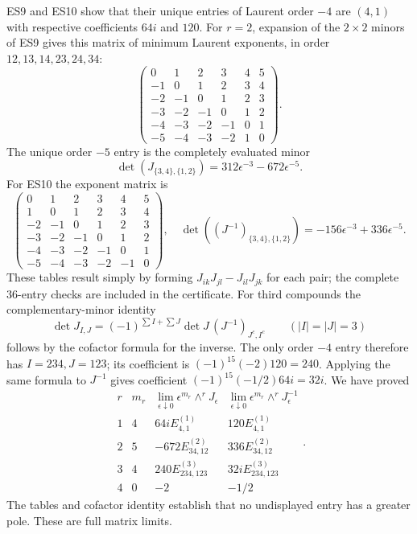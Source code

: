 \documentclass[11pt]{article}
\begin{document}
ES9 and ES10 show that their unique entries of Laurent order $-4$
are $(4,1)$ with respective coefficients $64i$ and $120$.
For $r=2$, expansion of the $2\times2$ minors of ES9 gives this
matrix of minimum Laurent exponents, in order $12,13,14,23,24,34$:
\[
 \begin{pmatrix}
 0&1&2&3&4&5\\-1&0&1&2&3&4\\-2&-1&0&1&2&3\\
 -3&-2&-1&0&1&2\\-4&-3&-2&-1&0&1\\-5&-4&-3&-2&1&0
 \end{pmatrix}.
 \tag{ES11}
\]
The unique order $-5$ entry is the completely evaluated minor
\[
 \det(J_{\{3,4\},\{1,2\}})=312\epsilon^{-3}-672\epsilon^{-5}.
\]
For ES10 the exponent matrix is
\[
 \begin{pmatrix}
 0&1&2&3&4&5\\1&0&1&2&3&4\\-2&-1&0&1&2&3\\
 -3&-2&-1&0&1&2\\-4&-3&-2&-1&0&1\\-5&-4&-3&-2&-1&0
 \end{pmatrix},
 \quad
 \det((J^{-1})_{\{3,4\},\{1,2\}})=-156\epsilon^{-3}+336\epsilon^{-5}.
 \tag{ES12}
\]
These tables result simply by forming $J_{ik}J_{jl}-J_{il}J_{jk}$
for each pair; the complete 36-entry checks are included in the
certificate. For third compounds the complementary-minor identity
\[
 \det J_{I,J}=(-1)^{\sum I+\sum J}\det J\,
                (J^{-1})_{J^c,I^c}\qquad(|I|=|J|=3)
\]
follows by the cofactor formula for the inverse. The only order
$-4$ entry therefore has $I=234,J=123$; its coefficient is
$(-1)^{15}(-2)120=240$. Applying the same formula to $J^{-1}$
gives coefficient $(-1)^{15}(-1/2)64i=32i$. We have proved
\[
\begin{array}{c|c|c|c}
 r&m_r&\lim_{\epsilon\downarrow0}\epsilon^{m_r}\wedge^rJ_\epsilon&
 \lim_{\epsilon\downarrow0}\epsilon^{m_r}\wedge^rJ_\epsilon^{-1}\\\hline
 1&4&64iE^{(1)}_{4,1}&120E^{(1)}_{4,1}\\
 2&5&-672E^{(2)}_{34,12}&336E^{(2)}_{34,12}\\
 3&4&240E^{(3)}_{234,123}&32iE^{(3)}_{234,123}\\
 4&0&-2&-1/2
\end{array}.
\tag{ES13}
\]
The tables and cofactor identity establish that no undisplayed entry
has a greater pole. These are full matrix limits.
\end{document}
